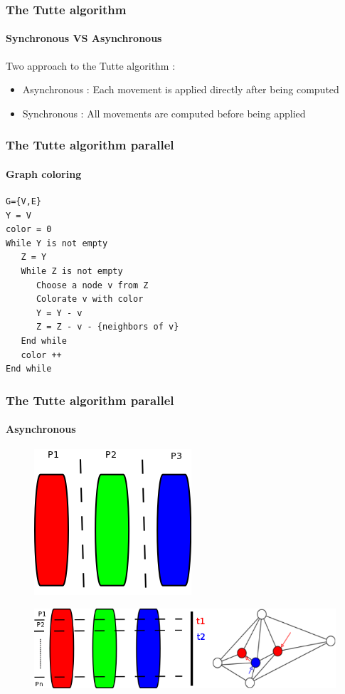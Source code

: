 \begin{frame}
\frametitle{The Tutte algorithm}
\framesubtitle{Synchronous VS Asynchronous}
Two approach to the Tutte algorithm :
\begin{exampleblock}{}
\begin{itemize}
\item Asynchronous : Each movement is applied directly after being computed
\item Synchronous : All movements are computed before being applied
\end{itemize}
\end{exampleblock}{}
\end{frame}

\begin{frame}[fragile]
\frametitle{The Tutte algorithm parallel}
\framesubtitle{Graph coloring}
\begin{exampleblock}{}
\begin{verbatim}
G={V,E}
Y = V
color = 0
While Y is not empty
   Z = Y
   While Z is not empty
      Choose a node v from Z
      Colorate v with color
      Y = Y - v
      Z = Z - v - {neighbors of v}
   End while
   color ++
End while
\end{verbatim}
\end{exampleblock}{}
\end{frame}

\begin{frame}
\frametitle{The Tutte algorithm parallel}
\framesubtitle{Asynchronous}
\begin{exampleblock}{}
\begin{figure}[!h]
\centering
\includegraphics[scale=0.5]{../rapport/img/distribution_verticale.png}
\end{figure}
\end{exampleblock}{}
\pause
\begin{exampleblock}{}
\begin{figure}[!h]
\centering
\includegraphics[scale=0.5]{../rapport/img/distrib.png}
\end{figure}
\end{exampleblock}{}
\end{frame}

